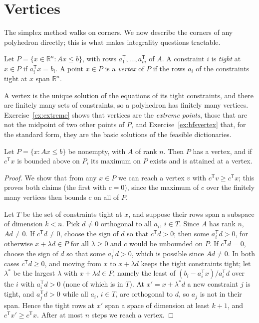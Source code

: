 \section{Vertices}\label{sec:vertices}

The simplex method walks on corners. We now describe the corners of any polyhedron directly; this is what makes integrality questions tractable.

\begin{definition}
Let $P=\{x\in\mathbb R^n:Ax\le b\}$, with rows $a_1^{\mathsf T},\dots,a_m^{\mathsf T}$ of $A$. A constraint $i$ is \emph{tight} at $x\in P$ if $a_i^{\mathsf T}x=b_i$. A point $x\in P$ is a \emph{vertex} of $P$ if the rows $a_i$
of the constraints tight at $x$ span $\mathbb R^n$.
\end{definition}

A vertex is the unique solution of the equations of its tight constraints, and there are finitely many sets of constraints, so a polyhedron has finitely many vertices. Exercise~\ref{ex:extreme} shows that vertices are the
\emph{extreme points}, those that are not the midpoint of two other points of $P$, and Exercise~\ref{ex:bfsvertex} that, for the standard form, they are the basic solutions of the feasible dictionaries.

\begin{theorem}\label{thm:vertex}
Let $P=\{x:Ax\le b\}$ be nonempty, with $A$ of rank $n$. Then $P$ has a vertex, and if $c^{\mathsf T}x$ is bounded above on $P$, its maximum on $P$ exists and is attained at a vertex.
\end{theorem}
\begin{proof}
We show that from any $x\in P$ we can reach a vertex $v$ with $c^{\mathsf T}v\ge c^{\mathsf T}x$; this proves both claims (the first with $c=0$), since the maximum of $c$ over the finitely many vertices then bounds $c$ on all of $P$.

Let $T$ be the set of constraints tight at $x$, and suppose their rows span a subspace of dimension $k<n$. Pick $d\ne0$ orthogonal to all $a_i$, $i\in T$. Since $A$ has rank $n$, $Ad\ne0$. If $c^{\mathsf T}d\ne0$, choose the
sign of $d$ so that $c^{\mathsf T}d>0$; then some $a_i^{\mathsf T}d>0$, for otherwise $x+\lambda d\in P$ for all $\lambda\ge0$ and $c$ would be unbounded on $P$. If $c^{\mathsf T}d=0$, choose the sign of $d$ so that some $a_i^{\mathsf T}d>0$, which is
possible since $Ad\ne0$. In both cases $c^{\mathsf T}d\ge0$, and moving from $x$ to $x+\lambda d$ keeps the tight constraints tight; let $\lambda^*$ be the largest $\lambda$ with $x+\lambda d\in P$, namely the least of
$(b_i-a_i^{\mathsf T}x)/a_i^{\mathsf T}d$ over the $i$ with $a_i^{\mathsf T}d>0$ (none of which is in $T$). At $x'=x+\lambda^*d$ a new constraint $j$ is tight, and $a_j^{\mathsf T}d>0$ while all $a_i$, $i\in T$, are orthogonal to $d$, so $a_j$ is not in their span.
Hence the tight rows at $x'$ span a space of dimension at least $k+1$, and $c^{\mathsf T}x'\ge c^{\mathsf T}x$. After at most $n$ steps we reach a vertex.
\end{proof}

